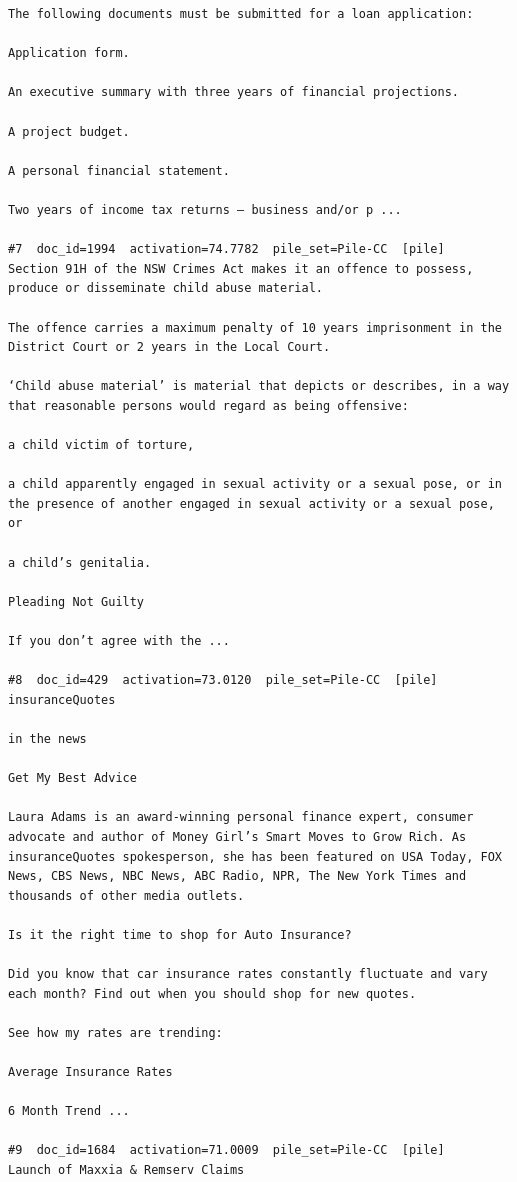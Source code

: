 \begin{verbatim}
The following documents must be submitted for a loan application:

Application form.

An executive summary with three years of financial projections.

A project budget.

A personal financial statement.

Two years of income tax returns – business and/or p ...

#7  doc_id=1994  activation=74.7782  pile_set=Pile-CC  [pile]
Section 91H of the NSW Crimes Act makes it an offence to possess, produce or disseminate child abuse material.

The offence carries a maximum penalty of 10 years imprisonment in the District Court or 2 years in the Local Court.

‘Child abuse material’ is material that depicts or describes, in a way that reasonable persons would regard as being offensive:

a child victim of torture,

a child apparently engaged in sexual activity or a sexual pose, or in the presence of another engaged in sexual activity or a sexual pose, or

a child’s genitalia.

Pleading Not Guilty

If you don’t agree with the ...

#8  doc_id=429  activation=73.0120  pile_set=Pile-CC  [pile]
insuranceQuotes

in the news

Get My Best Advice

Laura Adams is an award-winning personal finance expert, consumer advocate and author of Money Girl’s Smart Moves to Grow Rich. As insuranceQuotes spokesperson, she has been featured on USA Today, FOX News, CBS News, NBC News, ABC Radio, NPR, The New York Times and thousands of other media outlets.

Is it the right time to shop for Auto Insurance?

Did you know that car insurance rates constantly fluctuate and vary each month? Find out when you should shop for new quotes.

See how my rates are trending:

Average Insurance Rates

6 Month Trend ...

#9  doc_id=1684  activation=71.0009  pile_set=Pile-CC  [pile]
Launch of Maxxia & Remserv Claims


\end{verbatim}
